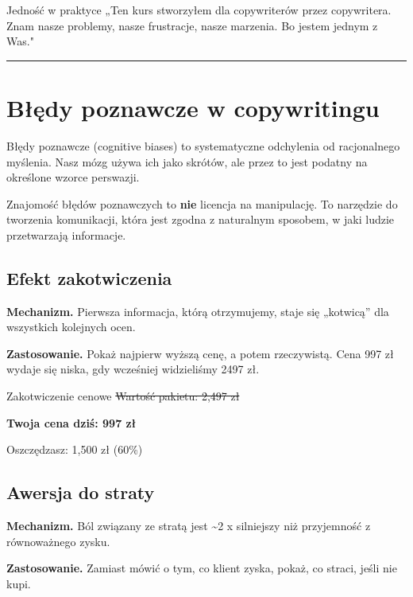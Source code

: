\documentclass[
  12pt,
  a4paper,
  twoside,
  openright,
  12pt,
  DIV=12,
  BCOR=12mm]{scrbook}
\newcommand{\decoline}{%
  \begin{center}
    \textcolor{bordergray}{\rule{0.3\textwidth}{0.5pt}}
  \end{center}
}
\begin{document}
\begin{przyklad}{Jedność w praktyce}
„Ten kurs stworzyłem dla copywriterów przez copywritera. Znam nasze problemy, nasze frustracje, nasze marzenia. Bo jestem jednym z Was."
\end{przyklad}

\decoline

\section{Błędy poznawcze w
copywritingu}\label{bux142ux119dy-poznawcze-w-copywritingu}

Błędy poznawcze (cognitive biases) to systematyczne odchylenia od
racjonalnego myślenia. Nasz mózg używa ich jako skrótów, ale przez to
jest podatny na określone wzorce perswazji.

\begin{wazne}
Znajomość błędów poznawczych to \textbf{nie} licencja na manipulację. To narzędzie do tworzenia komunikacji, która jest zgodna z naturalnym sposobem, w jaki ludzie przetwarzają informacje.
\end{wazne}

\subsection{Efekt zakotwiczenia}\label{efekt-zakotwiczenia}

\textbf{Mechanizm.} Pierwsza informacja, którą otrzymujemy, staje się
„kotwicą'' dla wszystkich kolejnych ocen.

\textbf{Zastosowanie.} Pokaż najpierw wyższą cenę, a potem rzeczywistą.
Cena 997 zł wydaje się niska, gdy wcześniej widzieliśmy 2497 zł.

\begin{przyklad}{Zakotwiczenie cenowe}
\sout{Wartość pakietu: 2,497 zł}

\textbf{Twoja cena dziś: 997 zł}

Oszczędzasz: 1,500 zł (60\%)
\end{przyklad}

\subsection{Awersja do straty}\label{awersja-do-straty}

\textbf{Mechanizm.} Ból związany ze stratą jest \textasciitilde2 x
silniejszy niż przyjemność z równoważnego zysku.

\textbf{Zastosowanie.} Zamiast mówić o tym, co klient zyska, pokaż, co
straci, jeśli nie kupi.
\end{document}
